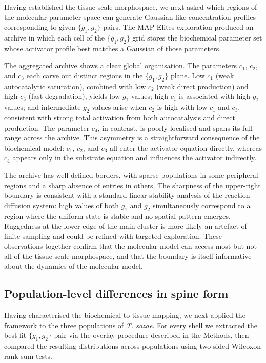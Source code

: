 \documentclass[11pt]{article}
\begin{document}
Having established the tissue-scale morphospace, we next asked which
regions of the molecular parameter space can generate Gaussian-like
concentration profiles corresponding to given $\{g_1, g_2\}$ pairs. The
MAP-Elites exploration produced an archive in which each cell of the
$\{g_1, g_2\}$ grid stores the biochemical parameter set whose activator
profile best matches a Gaussian of those parameters.

The aggregated archive shows a clear global organisation. The parameters
$c_1$, $c_2$, and $c_3$ each carve out distinct regions in the $\{g_1,
g_2\}$ plane. Low $c_1$ (weak autocatalytic saturation), combined with low
$c_2$ (weak direct production) and high $c_3$ (fast degradation), yields
low $g_2$ values; high $c_1$ is associated with high $g_2$ values; and
intermediate $g_2$ values arise when $c_2$ is high with low $c_1$ and
$c_3$, consistent with strong total activation from both autocatalysis and
direct production. The parameter $c_4$, in contrast, is poorly localised
and spans its full range across the archive. This asymmetry is a
straightforward consequence of the biochemical model: $c_1$, $c_2$, and
$c_3$ all enter the activator equation directly, whereas $c_4$ appears
only in the substrate equation and influences the activator indirectly.

The archive has well-defined borders, with sparse populations in some
peripheral regions and a sharp absence of entries in others. The sharpness
of the upper-right boundary is consistent with a standard linear stability
analysis of the reaction-diffusion system: high values of both $g_1$ and
$g_2$ simultaneously correspond to a region where the uniform state is
stable and no spatial pattern emerges. Ruggedness at the lower edge of the
main cluster is more likely an artefact of finite sampling and could be
refined with targeted exploration. These observations together confirm
that the molecular model can access most but not all of the tissue-scale
morphospace, and that the boundary is itself informative about the
dynamics of the molecular model.

\subsection{Population-level differences in spine form}

Having characterised the biochemical-to-tissue mapping, we next applied
the framework to the three populations of \textit{T. sazae}. For every shell we extracted the best-fit
$\{g_1, g_2\}$ pair via the overlay procedure described in the Methods,
then compared the resulting distributions across populations using
two-sided Wilcoxon rank-sum tests.
\end{document}
